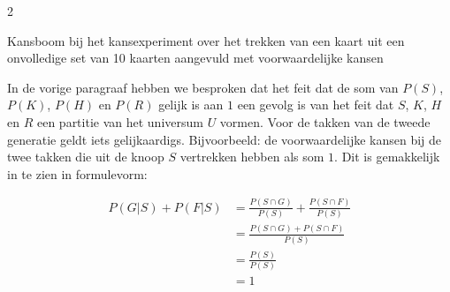 \begin{multicols} {2}
\begin{afbeeldingenv}
\caption{Kansboom bij het kansexperiment over het
trekken van een kaart uit een onvolledige set van 10 kaarten aangevuld met voorwaardelijke kansen}
\label{fig:kaartvb_voorw}
\end{afbeeldingenv}

In de vorige paragraaf hebben we besproken dat het feit dat de som van $P(S)$, $P(K)$, $P(H)$ en $P(R)$ gelijk is aan $1$ een gevolg is van het feit dat $S$, $K$, $H$ en $R$ een partitie van het universum $U$ vormen. Voor de takken van de tweede generatie geldt iets gelijkaardigs. Bijvoorbeeld: de voorwaardelijke kansen bij de twee takken die uit de knoop $S$ vertrekken hebben als som $1$. Dit is gemakkelijk in te zien in formulevorm:

\begin{equation*}
\begin{split}
P(G|S)+P(F|S) & =\frac{P(S \cap G)}{P(S)}+\frac{P(S \cap F)}{P(S)} \\
 & =\frac{P(S \cap G)+P(S \cap F)}{P(S)} \\
 & =\frac{P(S)}{P(S)} \\
 & =1
\end{split}
\end{equation*}



\end{multicols}
